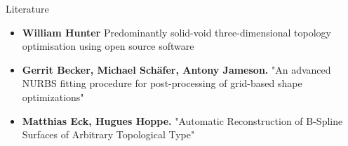 \begin{frame}{Literature}
\begin{itemize}
\item \textbf{William Hunter} Predominantly solid-void three-dimensional topology optimisation using open source software
\item \textbf{Gerrit Becker, Michael Sch\"afer, Antony Jameson.} "An advanced NURBS fitting procedure for post-processing of grid-based shape optimizations"
\item \textbf{Matthias Eck, Hugues Hoppe.} "Automatic Reconstruction of B-Spline Surfaces of Arbitrary Topological Type"
\end{itemize}
\end{frame}
